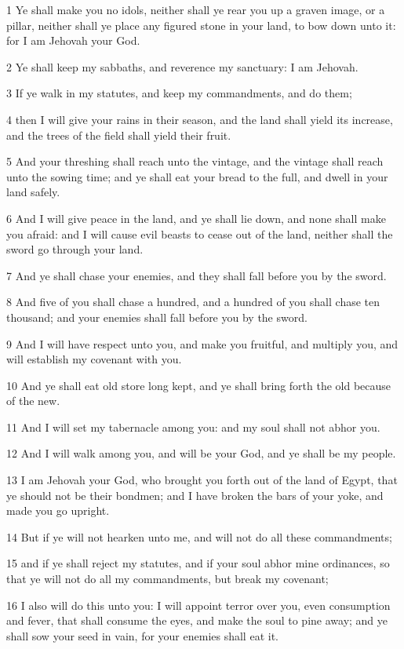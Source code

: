 \par 1 Ye shall make you no idols, neither shall ye rear you up a graven image, or a pillar, neither shall ye place any figured stone in your land, to bow down unto it: for I am Jehovah your God.
\par 2 Ye shall keep my sabbaths, and reverence my sanctuary: I am Jehovah.
\par 3 If ye walk in my statutes, and keep my commandments, and do them;
\par 4 then I will give your rains in their season, and the land shall yield its increase, and the trees of the field shall yield their fruit.
\par 5 And your threshing shall reach unto the vintage, and the vintage shall reach unto the sowing time; and ye shall eat your bread to the full, and dwell in your land safely.
\par 6 And I will give peace in the land, and ye shall lie down, and none shall make you afraid: and I will cause evil beasts to cease out of the land, neither shall the sword go through your land.
\par 7 And ye shall chase your enemies, and they shall fall before you by the sword.
\par 8 And five of you shall chase a hundred, and a hundred of you shall chase ten thousand; and your enemies shall fall before you by the sword.
\par 9 And I will have respect unto you, and make you fruitful, and multiply you, and will establish my covenant with you.
\par 10 And ye shall eat old store long kept, and ye shall bring forth the old because of the new.
\par 11 And I will set my tabernacle among you: and my soul shall not abhor you.
\par 12 And I will walk among you, and will be your God, and ye shall be my people.
\par 13 I am Jehovah your God, who brought you forth out of the land of Egypt, that ye should not be their bondmen; and I have broken the bars of your yoke, and made you go upright.
\par 14 But if ye will not hearken unto me, and will not do all these commandments;
\par 15 and if ye shall reject my statutes, and if your soul abhor mine ordinances, so that ye will not do all my commandments, but break my covenant;
\par 16 I also will do this unto you: I will appoint terror over you, even consumption and fever, that shall consume the eyes, and make the soul to pine away; and ye shall sow your seed in vain, for your enemies shall eat it.

